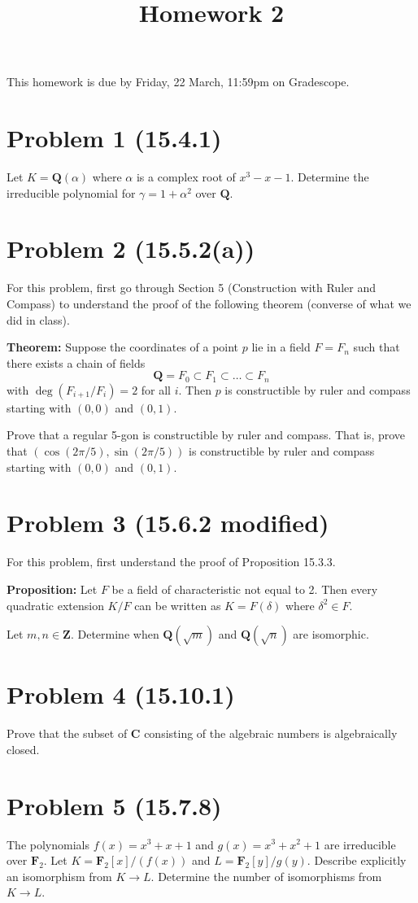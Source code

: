 \documentclass{amsart}
\date{}
\title{Homework 2}
\begin{document}
\maketitle
This homework is due by Friday, 22 March, 11:59pm on Gradescope.
\section{Problem 1 (15.4.1)}
\label{sec:org6ab0fa2}
Let \(K = \mathbf{Q}(\alpha)\) where \(\alpha\) is a complex root of \(x^3-x-1\).
Determine the irreducible polynomial for \(\gamma = 1 + \alpha^2\) over \(\mathbf{Q}\).
\section{Problem 2 (15.5.2(a))}
\label{sec:org0e2271c}
For this problem, first go through Section 5 (Construction with Ruler and Compass) to understand the proof of the following theorem (converse of what we did in class).

\bigskip

\noindent
\textbf{\textbf{Theorem:}} Suppose the coordinates of a point \(p\) lie in a field \(F = F_n\) such that there exists a chain of fields
\[ \mathbf{Q} = F_0 \subset F_1 \subset \dots \subset F_n\]
with \(\deg (F_{i+1} / F_i) = 2\) for all \(i\).
Then \(p\) is constructible by ruler and compass starting with \((0,0)\) and \((0,1)\).

\bigskip

Prove that a regular 5-gon is constructible by ruler and compass.
That is, prove that \((\cos (2\pi/5), \sin (2\pi/5))\) is constructible by ruler and compass starting with \((0,0)\) and \((0,1)\).
\section{Problem 3 (15.6.2 modified)}
\label{sec:orgd8acca5}
For this problem, first understand the proof of Proposition 15.3.3.

\bigskip

\noindent
\textbf{\textbf{Proposition:}} Let \(F\) be a field of characteristic not equal to 2.  Then every quadratic extension \(K/F\) can be written as \(K = F(\delta)\) where \(\delta^2 \in F\).

\bigskip

Let \(m, n \in \mathbf{Z}\).
Determine when \(\mathbf{Q}(\sqrt m)\) and \(\mathbf{Q}(\sqrt n)\) are isomorphic.
\section{Problem 4 (15.10.1)}
\label{sec:orgd58f874}
Prove that the subset of \(\mathbf{C}\) consisting of the algebraic numbers is algebraically closed.
\section{Problem 5 (15.7.8)}
\label{sec:orgdeb7abb}
The polynomials \(f(x) = x^3 + x + 1\) and \(g(x) = x^3 + x^2 + 1\) are irreducible over \(\mathbf{F}_2\).
Let \(K = \mathbf{F}_2[x]/(f(x))\) and \(L = \mathbf{F}_2[y]/g(y)\).
Describe explicitly an isomorphism from \(K \to L\).
Determine the number of isomorphisms from \(K \to L\).
\end{document}
